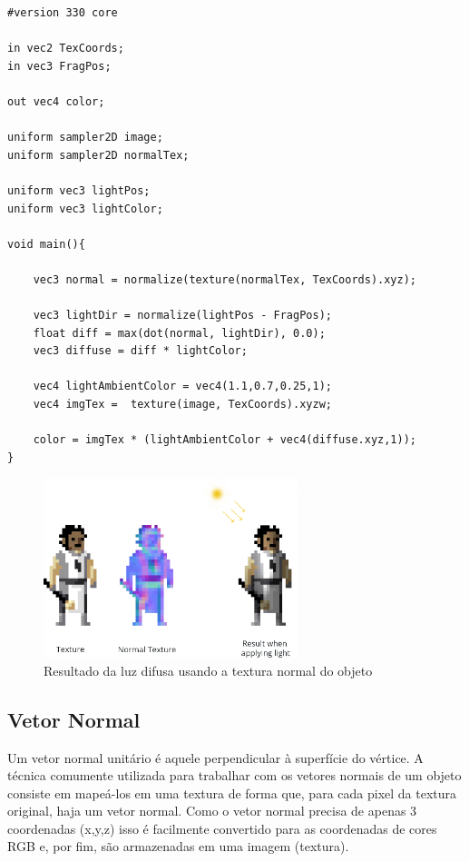 \documentclass[12pt, 
openright, 
oneside, 
a4paper,    
brazil]{facom-ufu-abntex2}
\begin{document}
\begin{lstlisting}[caption=Fragment Shader com luz ambiente e difusa]
#version 330 core

in vec2 TexCoords;
in vec3 FragPos;  

out vec4 color;

uniform sampler2D image;
uniform sampler2D normalTex;

uniform vec3 lightPos; 
uniform vec3 lightColor;

void main(){

	vec3 normal = normalize(texture(normalTex, TexCoords).xyz);

	vec3 lightDir = normalize(lightPos - FragPos);
	float diff = max(dot(normal, lightDir), 0.0);
	vec3 diffuse = diff * lightColor;
	
	vec4 lightAmbientColor = vec4(1.1,0.7,0.25,1);
	vec4 imgTex =  texture(image, TexCoords).xyzw;
	
	color = imgTex * (lightAmbientColor + vec4(diffuse.xyz,1));
}
\end{lstlisting}



\begin{figure}[H]
	\centering
	\includegraphics[width=20em]{imagens/normalTextureExample.png}
	\caption{Resultado da luz difusa usando a textura normal do objeto}
\end{figure}

\subsection{Vetor Normal}

Um vetor normal unitário é aquele perpendicular à superfície do vértice. A técnica comumente utilizada para trabalhar com os vetores normais de um objeto consiste em mapeá-los em uma textura de forma que, para cada pixel da textura original, haja um vetor normal. Como o vetor normal precisa de apenas 3 coordenadas (x,y,z) isso é facilmente convertido para as coordenadas de cores RGB e, por fim, são armazenadas em uma imagem (textura).
\end{document}

